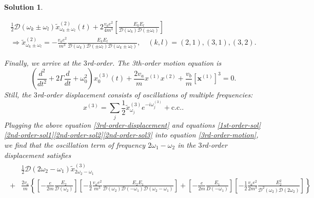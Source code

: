 \documentclass[UTF8,10pt,a4paper]{article}
\theoremstyle{Problem}
\theoremstyle{Solution}
\newtheorem*{sol}{Solution}
\begin{document}
\begin{sol}
\begin{itemize}
              \begin{gather}
                  \frac{1}{2}\mathcal{D}(\omega_k\pm\omega_l)\tilde{x}_{\omega_k\pm\omega_l}^{(2)}(t)+2\frac{v_ae^2}{4m^3}\left[\frac{E_kE_l}{\mathcal{D}(\omega_k)\mathcal{D}(\pm\omega_l)}\right]\\
                  \label{2nd-order-sol3}
                  \Longrightarrow\tilde{x}_{\omega_k\pm\omega_l}^{(2)}=-\frac{v_ae^2}{m^3}\frac{E_kE_l}{\mathcal{D}(\omega_k)\mathcal{D}(\pm\omega_l)\mathcal{D}(\omega_k\pm\omega_l)},\quad(k,l)=(2,1),(3,1),(3,2).
              \end{gather}
    \end{itemize}
    Finally, we arrive at the $3$rd-order. The 3th-order motion equation is
    \begin{equation}
        \label{3rd-order-motion}
        \left(\frac{d^2}{dt^2}+2\Gamma\frac{d}{dt}+\omega_0^2\right)x_0^{(3)}(t)+\frac{2v_a}{m}x^{(1)}x^{(2)}+\frac{v_b}{m}\left[\bm{x}^{(1)}\right]^3=0.
    \end{equation}
    Still, the $3$rd-order displacement consists of oscillations of multiple frequencies:
    \begin{equation}
        \label{3rd-order-displacement}
        x^{(3)}=\sum_j\frac{1}{2}\tilde{x}_{\omega_j}^{(3)}e^{-i\omega_j^{(3)}}+\text{c.c.}.
    \end{equation}
    Plugging the above equation \eqref{3rd-order-displacement} and equations \eqref{1st-order-sol}\eqref{2nd-order-sol1}\eqref{2nd-order-sol2}\eqref{2nd-order-sol3} into equation \eqref{3rd-order-motion}, we find that the oscillation term of frequency $2\omega_1-\omega_2$ in the $3$rd-order displacement satisfies
    \begin{gather}
        \begin{align}
            \nonumber  & \frac{1}{2}\mathcal{D}(2\omega_2-\omega_1)\tilde{x}_{2\omega_2-\omega_1}^{(3)}                                                                                                                                                                                                                                                                                                        & \\
            \nonumber+ & \frac{2v_a}{m}\left\{\left[-\frac{e}{2m}\frac{E_2}{\mathcal{D}(\omega_2)}\right]\left[-\frac{1}{2}\frac{v_ae^2}{m^3}\frac{E_2E_1}{\mathcal{D}(\omega_2)\mathcal{D}(-\omega_1)\mathcal{D}(\omega_2-\omega_1)}\right]+\left[-\frac{e}{2m}\frac{E_1}{D(-\omega_1)}\right]\left[-\frac{1}{2}\frac{v_ae^2}{2m^3}\frac{E_2^2}{\mathcal{D}^2(\omega_2)\mathcal{D}(2\omega_2)}\right]\right\}   \\

\end{align}
\end{gather}
\end{sol}
\end{document}
